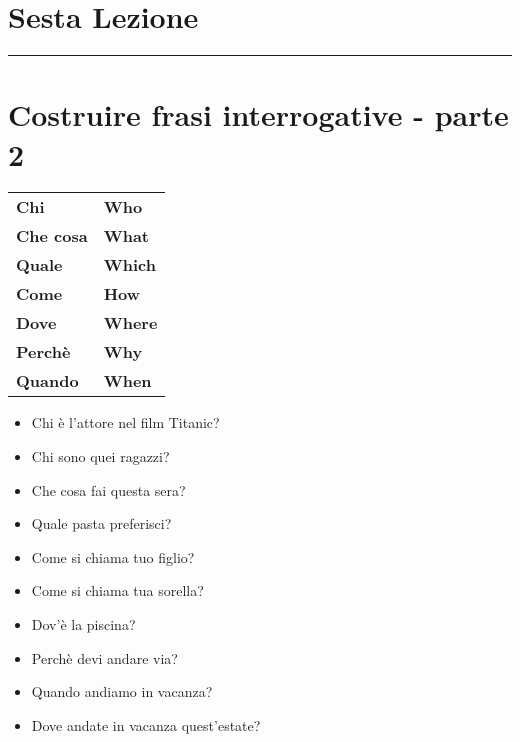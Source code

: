 \documentclass[letter,11pt]{article}
\begin{document}
\section*{\Large{Sesta Lezione}}
\noindent\rule{16cm}{1pt}

\setlength{\parindent}{260pt}

\vskip 0.2in
\section*{Costruire frasi interrogative - parte 2}
\vskip 0.2in

\begin{tabular}{ |p{3cm}| p{3cm}| }

    \hline
    \hline
      &   \\ \hline
    {\bf Chi}   & {\bf Who}    \\ \hline
    {\bf Che cosa}    & {\bf What}       \\ \hline
    {\bf Quale} & {\bf Which}  \\ \hline
    {\bf Come}   & {\bf How}    \\ \hline
    {\bf Dove}    & {\bf Where}       \\ \hline
    {\bf Perchè} & {\bf Why}  \\ \hline
    {\bf Quando} & {\bf When}  \\ \hline
    \hline
\end{tabular}

\vskip 0.5in

\begin{multicols}{2}
\begin{itemize}
    \item Chi è l'attore nel film Titanic?
    \item Chi sono quei ragazzi?
    \item Che cosa fai questa sera?
    \item Quale pasta preferisci?
    \item Come si chiama tuo figlio?
    \item Come si chiama tua sorella?
    \item Dov'è la piscina?
    \item Perchè devi andare via?
    \item Quando andiamo in vacanza?
    \item Dove andate in vacanza quest'estate?


\end{itemize}
\end{multicols}
\vskip 0.2in
\end{document}
